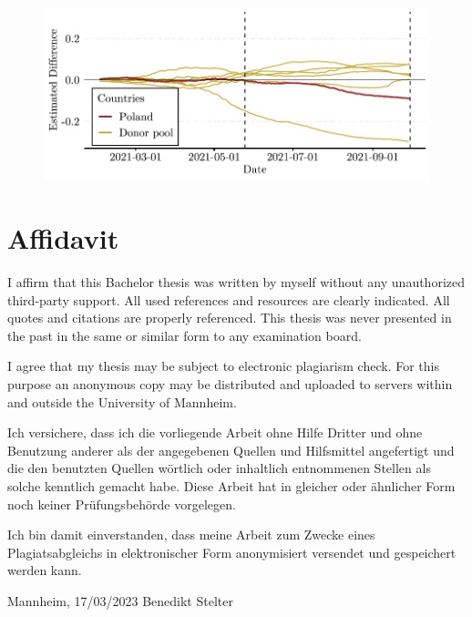 \documentclass{scrbook}
\begin{document}
{\begin{appendices}
\begin{figure}[h]
\begin{center}\includegraphics{bachelor_thesis_files/figure-latex/unnamed-chunk-9-1} \end{center}
\end{figure}


\end{appendices}

\chapter*{Affidavit}

\thispagestyle{empty}



I affirm that this Bachelor thesis was written by myself without any unauthorized third-party support. All used references and resources are clearly indicated. All quotes and citations are properly referenced. This thesis was never presented in the past in the same or similar form to any examination board. 

\noindent I agree that my thesis may be subject to electronic plagiarism check. For this purpose an anonymous copy may be distributed and uploaded to
servers within and outside the University of Mannheim.

\vspace{2\baselineskip}

\noindent Ich versichere, dass ich die vorliegende Arbeit ohne Hilfe Dritter und ohne Benutzung anderer
als der angegebenen Quellen und Hilfsmittel angefertigt und die den benutzten Quellen
wörtlich oder inhaltlich entnommenen Stellen als solche kenntlich gemacht habe. Diese Arbeit
hat in gleicher oder ähnlicher Form noch keiner Prüfungsbehörde vorgelegen.

\noindent Ich bin damit einverstanden, dass meine Arbeit zum Zwecke eines Plagiatsabgleichs in
elektronischer Form anonymisiert versendet und gespeichert werden kann.

\vspace{4\baselineskip}
\begin{center}
\parbox{.8\textwidth}{Mannheim, 17/03/2023 \hfill Benedikt Stelter}
\end{center}


}
\end{document}
